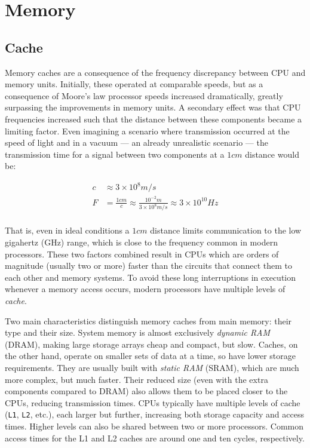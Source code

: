 \section{Memory}

\subsection{Cache}

\label{subsec:arch:cache}

Memory caches are a consequence of the frequency discrepancy between CPU and
memory units.  Initially, these operated at comparable speeds, but as a
consequence of Moore's law processor speeds increased dramatically, greatly
surpassing the improvements in memory units.  A secondary effect was that CPU
frequencies increased such that the distance between these components became a
limiting factor.  Even imagining a scenario where transmission occurred at the
speed of light and in a vacuum --- an already unrealistic scenario --- the
transmission time for a signal between two components at a $1cm$ distance would
be:

\begin{align*}
    c &\approx 3 \times 10^8m/s \\
    F &= \frac{1cm}{c}
       \approx \frac{10^{-2}m}{3 \times 10^8m/s}
       \approx 3 \times 10^{10}Hz \\
\end{align*}

That is, even in ideal conditions a $1cm$ distance limits communication to the
low gigahertz (GHz) range, which is close to the frequency common in modern
processors.  These two factors combined result in CPUs which are orders of
magnitude (usually two or more) faster than the circuits that connect them to
each other and memory systems.  To avoid these long interruptions in execution
whenever a memory access occurs, modern processors have multiple levels of
\textit{cache}.

Two main characteristics distinguish memory caches from main memory: their type
and their size.  System memory is almost exclusively \textit{dynamic RAM}
(DRAM), making large storage arrays cheap and compact, but slow.  Caches, on the
other hand, operate on smaller sets of data at a time, so have lower storage
requirements.  They are usually built with \textit{static RAM} (SRAM), which are
much more complex, but much faster.  Their reduced size (even with the extra
components compared to DRAM) also allows them to be placed closer to the CPUs,
reducing transmission times.  CPUs typically have multiple levels of cache
(\texttt{L1}, \texttt{L2}, etc.), each larger but further, increasing both
storage capacity and access times.  Higher levels can also be shared between two
or more processors.  Common access times for the L1 and L2 caches are around one
and ten cycles, respectively.

